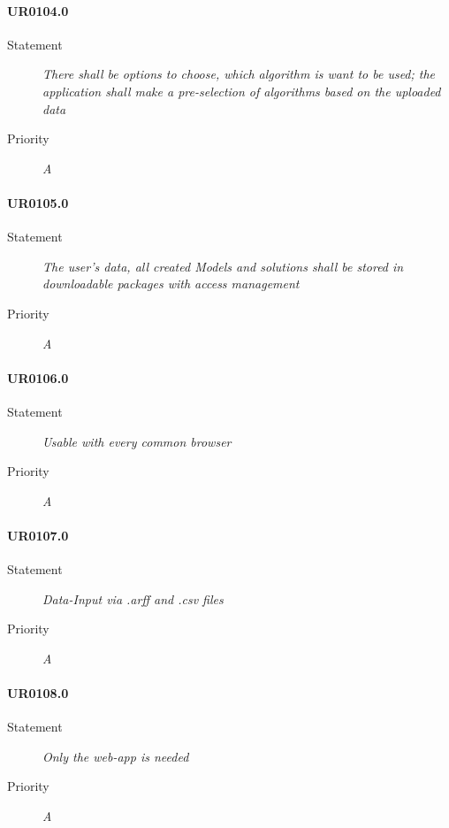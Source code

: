 \paragraph{UR0104.0}
\begin{description}
\item [Statement] \textit{
There shall be options to choose, which algorithm is want to be used; the application shall make a pre-selection of algorithms based on the uploaded data
}
\item [Priority] \textit{A}
\end{description}

\paragraph{UR0105.0}
\begin{description}
\item [Statement] \textit{
The user's data, all created \glspl{Model} and solutions shall be stored in downloadable packages with access management
}
\item [Priority] \textit{A}
\end{description}

\paragraph{UR0106.0}
\begin{description}
\item [Statement] \textit{
Usable with every common \gls{browser}
}
\item [Priority] \textit{A}
\end{description}

\paragraph{UR0107.0}
\begin{description}
\item [Statement] \textit{
Data-Input via .\gls{arff} and .\gls{csv} files
}
\item [Priority] \textit{A}
\end{description}

\paragraph{UR0108.0}
\begin{description}
\item [Statement] \textit{
Only the \gls{web-app} is needed
}
\item [Priority] \textit{A}
\end{description}

